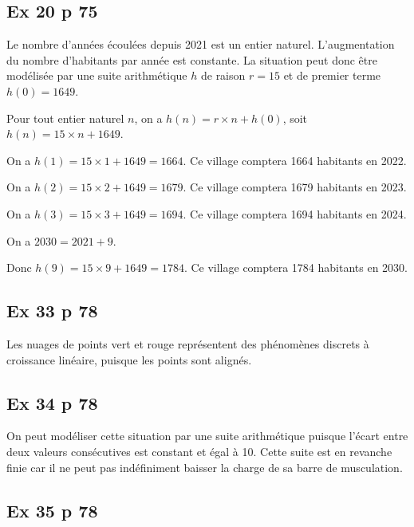 \documentclass[12pt,a4paper]{book}
\begin{document}
\subsection*{Ex 20 p 75}


\begin{enumMet}
	\item  
	\begin{enumMet}
		\item Le nombre d’années écoulées depuis 2021 est un entier naturel. L’augmentation du nombre d’habitants par année est constante. La situation peut donc être modélisée par une suite arithmétique $h$ de raison $r=15$ et de premier terme $h\left(0\right)=1649$.
		\item Pour tout entier naturel $n$, on a $h\left(n\right)=r \times n + h\left(0\right)$, soit $h\left(n\right)=15 \times n +1649$.
	\end{enumMet}
	\item On a $h\left(1\right)=15 \times 1 +1649=1664$. Ce village comptera 1664 habitants en 2022.
	
	On a $h\left(2\right)=15 \times 2 +1649=1679$. Ce village comptera 1679 habitants en 2023.
	
	On a $h\left(3\right)=15 \times 3 +1649=1694$. Ce village comptera 1694 habitants en 2024.
	
	On a $2030=2021+9$.
	
	Donc $h\left(9\right)=15 \times 9 +1649=1784$. Ce village comptera 1784 habitants en 2030.
\end{enumMet}

\subsection*{Ex 33 p 78}

Les nuages de points vert et rouge représentent des phénomènes discrets à croissance linéaire, puisque les points sont alignés.

\subsection*{Ex 34 p 78}

On peut modéliser cette situation par une suite arithmétique puisque l’écart entre deux valeurs consécutives est constant et égal à 10. Cette suite est en revanche finie car il ne peut pas indéfiniment baisser la charge de sa barre de musculation.

\subsection*{Ex 35 p 78}
\end{document}
